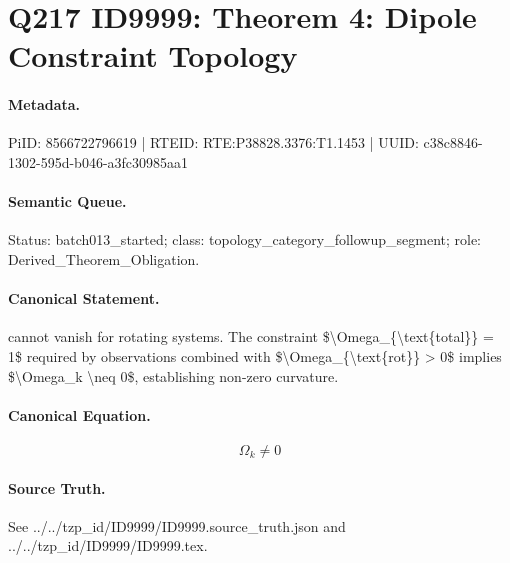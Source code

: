 \section*{Q217 ID9999: Theorem 4: Dipole Constraint Topology}
\paragraph{Metadata.}
PiID: 8566722796619 | RTEID: RTE:P38828.3376:T1.1453 | UUID: c38c8846-1302-595d-b046-a3fc30985aa1

\paragraph{Semantic Queue.}
Status: batch013\_started; class: topology\_category\_followup\_segment; role: Derived\_Theorem\_Obligation.

\paragraph{Canonical Statement.}
cannot vanish for rotating systems. The constraint \$\textbackslash{}Omega\_\{\textbackslash{}text\{total\}\} = 1\$ required by observations combined with \$\textbackslash{}Omega\_\{\textbackslash{}text\{rot\}\} > 0\$ implies \$\textbackslash{}Omega\_k \textbackslash{}neq 0\$, establishing non-zero curvature.

\paragraph{Canonical Equation.}
\[
\Omega_k \neq 0
\]

\paragraph{Source Truth.}
See ../../tzp\_id/ID9999/ID9999.source\_truth.json and ../../tzp\_id/ID9999/ID9999.tex.
